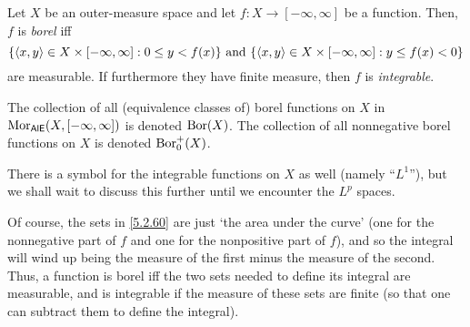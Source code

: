 \begin{dfn}\label{IntegrableFunction}
Let $X$ be an outer-measure space and let $f:X\rightarrow [-\infty ,\infty ]$ be a function.  Then, $f$ is \emph{borel} iff
\begin{equation}\label{5.2.60}
\{ \langle x,y\rangle\in X\times [-\infty ,\infty ]:0\leq y<f(x)\} \text{ and }\{ \langle x,y\rangle\in X\times [-\infty ,\infty ]:y\leq f(x)<0\}
\end{equation}
are measurable.  If furthermore they have finite measure, then $f$ is \emph{integrable}.
\begin{rmk}
The collection of all (equivalence classes of) borel functions on $X$ in $\operatorname{Mor} _{\mathsf{AlE}}(X,[-\infty ,\infty ])$ is denoted $\operatorname{Bor} (X)$.  The collection of all nonnegative borel functions on $X$ is denoted $\operatorname{Bor} _0^+(X)$.
\end{rmk}
\begin{rmk}
There is a symbol for the integrable functions on $X$ as well (namely ``$L^1$''), but we shall wait to discuss this further until we encounter the $L^p$ spaces.
\end{rmk}
\begin{rmk}
Of course, the sets in \eqref{5.2.60} are just `the area under the curve' (one for the nonnegative part of $f$ and one for the nonpositive part of $f$), and so the integral will wind up being the measure of the first minus the measure of the second.  Thus, a function is borel iff the two sets needed to define its integral are measurable, and is integrable if the measure of these sets are finite (so that one can subtract them to define the integral).
\end{rmk}
\end{dfn}

